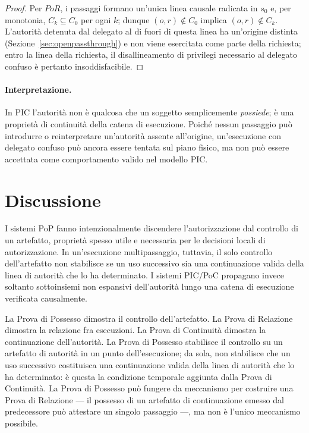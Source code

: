 \documentclass[11pt]{article}
\begin{document}
\begin{proof}
Per $PoR$, i passaggi formano un'unica linea causale radicata in $s_0$ e, per
monotonia, $C_k \subseteq C_0$ per ogni $k$; dunque $(o,r)\notin C_0$ implica
$(o,r)\notin C_k$. L'autorità detenuta dal delegato al di fuori di questa linea
ha un'origine distinta (Sezione~\ref{sec:openpassthrough}) e non viene esercitata
come parte della richiesta; entro la linea della richiesta, il disallineamento
di privilegi necessario al delegato confuso è pertanto insoddisfacibile.
\end{proof}

\paragraph{Interpretazione.}
In PIC l'autorità non è qualcosa che un soggetto semplicemente \emph{possiede};
è una proprietà di continuità della catena di esecuzione. Poiché nessun
passaggio può introdurre o reinterpretare un'autorità assente all'origine,
un'esecuzione con delegato confuso può ancora essere tentata sul piano fisico,
ma non può essere accettata come comportamento valido nel modello PIC.

\section{Discussione}

I sistemi PoP fanno intenzionalmente discendere l'autorizzazione dal controllo
di un artefatto, proprietà spesso utile e necessaria per le decisioni locali di
autorizzazione. In un'esecuzione multipassaggio, tuttavia, il solo controllo
dell'artefatto non stabilisce se un uso successivo sia una continuazione valida
della linea di autorità che lo ha determinato. I sistemi PIC/PoC propagano invece
soltanto sottoinsiemi non espansivi dell'autorità lungo una catena di esecuzione
verificata causalmente.

La Prova di Possesso dimostra il controllo dell'artefatto.
La Prova di Relazione dimostra la relazione fra esecuzioni.
La Prova di Continuità dimostra la continuazione dell'autorità.
La Prova di Possesso stabilisce il controllo su un artefatto di autorità in un
punto dell'esecuzione; da sola, non stabilisce che un uso successivo costituisca
una continuazione valida della linea di autorità che lo ha determinato: è questa
la condizione temporale aggiunta dalla Prova di Continuità. La Prova di Possesso
può fungere da meccanismo per costruire una Prova di Relazione --- il possesso di
un artefatto di continuazione emesso dal predecessore può attestare un singolo
passaggio ---, ma non è l'unico meccanismo possibile.
\end{document}
